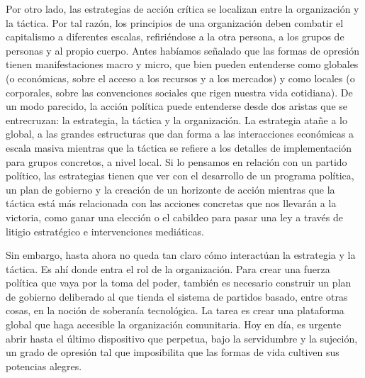 Por otro lado, las estrategias de acción crítica se localizan entre la organización y la táctica. Por tal razón, los principios de una organización deben combatir el capitalismo a diferentes escalas, refiriéndose a la otra persona, a los grupos de personas y al propio cuerpo. Antes habíamos señalado que las formas de opresión tienen manifestaciones macro y micro, que bien pueden entenderse como globales (o económicas, sobre el acceso a los recursos y a los mercados) y como locales (o corporales, sobre las convenciones sociales que rigen nuestra vida cotidiana). De un modo parecido, la acción política puede entenderse desde dos aristas que se entrecruzan: la estrategia, la táctica y la organización. La estrategia atañe a lo global, a las grandes estructuras que dan forma a las interacciones económicas a escala masiva mientras que la táctica se refiere a los detalles de implementación para grupos concretos, a nivel local. Si lo pensamos en relación con un partido político, las estrategias tienen que ver con el desarrollo de un programa política, un plan de gobierno y la creación de un horizonte de acción mientras que la táctica está más relacionada con las acciones concretas que nos llevarán a la victoria, como ganar una elección o el cabildeo para pasar una ley a través de litigio estratégico e intervenciones mediáticas.

Sin embargo, hasta ahora no queda tan claro cómo interactúan la estrategia y la táctica. Es ahí donde entra el rol de la organización. Para crear una fuerza política que vaya por la toma del poder, también es necesario construir un plan de gobierno deliberado al que tienda el sistema de partidos basado, entre otras cosas, en la noción de soberanía tecnológica. La tarea es crear una plataforma global que haga accesible la organización comunitaria. Hoy en día, es urgente abrir hasta el último dispositivo que perpetua, bajo la servidumbre y la sujeción, un grado de opresión tal que imposibilita que las formas de vida cultiven sus potencias alegres.

